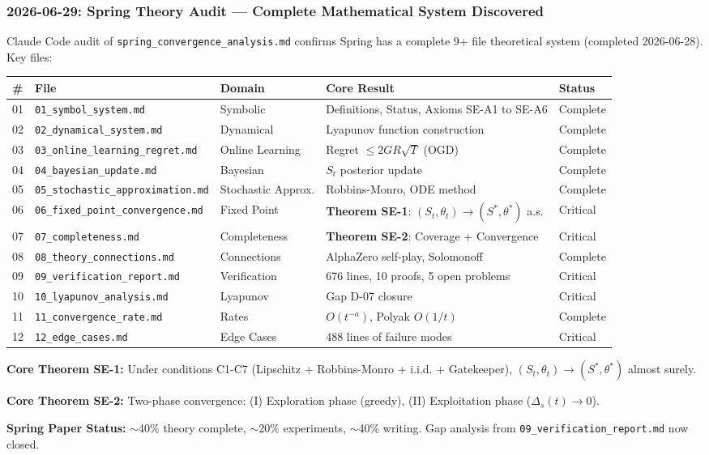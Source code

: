 \documentclass[12pt]{article}
\begin{document}
\subsubsection{2026-06-29: Spring Theory Audit --- Complete Mathematical System Discovered}
Claude Code audit of \texttt{spring\_convergence\_analysis.md} confirms Spring has a complete 9+ file theoretical system (completed 2026-06-28). Key files:\par
\begin{longtable}{@{}p{} p{} p{} p{} p{}@{}}
\toprule \# & File & Domain & Core Result & Status \\
\midrule
01 & \texttt{01\_symbol\_system.md} & Symbolic & Definitions, Status, Axioms SE-A1 to SE-A6 & Complete \\
02 & \texttt{02\_dynamical\_system.md} & Dynamical & Lyapunov function construction & Complete \\
03 & \texttt{03\_online\_learning\_regret.md} & Online Learning & Regret \(\leq 2GR\sqrt{T}\) (OGD) & Complete \\
04 & \texttt{04\_bayesian\_update.md} & Bayesian & \(S_t\) posterior update & Complete \\
05 & \texttt{05\_stochastic\_approximation.md} & Stochastic Approx. & Robbins-Monro, ODE method & Complete \\
06 & \texttt{06\_fixed\_point\_convergence.md} & Fixed Point & \textbf{Theorem SE-1}: \((S_t,\theta_t)\to(S^*,\theta^*)\) a.s. & Critical \\
07 & \texttt{07\_completeness.md} & Completeness & \textbf{Theorem SE-2}: Coverage + Convergence & Critical \\
08 & \texttt{08\_theory\_connections.md} & Connections & AlphaZero self-play, Solomonoff & Complete \\
09 & \texttt{09\_verification\_report.md} & Verification & 676 lines, 10 proofs, 5 open problems & Critical \\
10 & \texttt{10\_lyapunov\_analysis.md} & Lyapunov & Gap D-07 closure & Critical \\
11 & \texttt{11\_convergence\_rate.md} & Rates & \(O(t^{-a})\), Polyak \(O(1/t)\) & Complete \\
12 & \texttt{12\_edge\_cases.md} & Edge Cases & 488 lines of failure modes & Critical \\
\bottomrule
\end{longtable}

\textbf{Core Theorem SE-1:} Under conditions C1-C7 (Lipschitz + Robbins-Monro + i.i.d. + Gatekeeper), \((S_t, \theta_t) \to (S^*, \theta^*)\) almost surely.\par
\textbf{Core Theorem SE-2:} Two-phase convergence: (I) Exploration phase (greedy), (II) Exploitation phase (\(\Delta_s(t) \to 0\)).\par
\textbf{Spring Paper Status:} \(\sim\)40\% theory complete, \(\sim\)20\% experiments, \(\sim\)40\% writing. Gap analysis from \texttt{09\_verification\_report.md} now closed.
\end{document}
